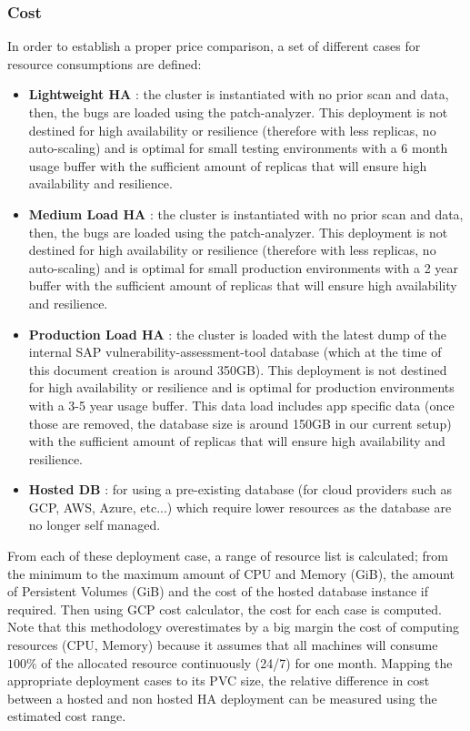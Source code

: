 \documentclass[11pt]{article}
\begin{document}
\subsubsection{Cost}

\hspace{5mm} In order to establish a proper price comparison, a set of different cases for resource consumptions are defined: 
\begin{itemize}
    \item \textbf{Lightweight HA} : the cluster is instantiated with no prior scan and data, then, the bugs are loaded using the patch-analyzer. This deployment is not destined for high availability or resilience (therefore with less replicas, no auto-scaling) and is optimal for small testing environments with a 6 month usage buffer with the sufficient amount of replicas that will ensure high availability and resilience.
    \item \textbf{Medium Load HA} : the cluster is instantiated with no prior scan and data, then, the bugs are loaded using the patch-analyzer. This deployment is not destined for high availability or resilience (therefore with less replicas, no auto-scaling) and is optimal for small production environments with a 2 year buffer with the sufficient amount of replicas that will ensure high availability and resilience.
    \item \textbf{Production Load HA} : the cluster is loaded with the latest dump of the internal SAP vulnerability-assessment-tool database (which at the time of this document creation is around 350GB). This deployment is not destined for high availability or resilience and is optimal for production environments with a 3-5 year usage buffer. This data load includes app specific data (once those are removed, the database size is around 150GB in our current setup) with the sufficient amount of replicas that will ensure high availability and resilience.
    \item \textbf{Hosted DB} : for using a pre-existing database (for cloud providers such as GCP, AWS, Azure, etc...) which require lower resources as the database are no longer self managed.
\end{itemize}

\vspace{3mm}
From each of these deployment case, a range of resource list is calculated; from the minimum to the maximum amount of CPU and Memory (GiB), the amount of Persistent Volumes (GiB) and the cost of the hosted database instance if required. Then using GCP cost calculator, the cost for each case is computed. Note that this methodology overestimates by a big margin the cost of computing resources (CPU, Memory) because it assumes that all machines will consume $100\%$ of the allocated resource continuously (24/7) for one month. Mapping the appropriate deployment cases to its PVC size, the relative difference in cost between a hosted and non hosted HA deployment can be measured using the estimated cost range. 
\end{document}
